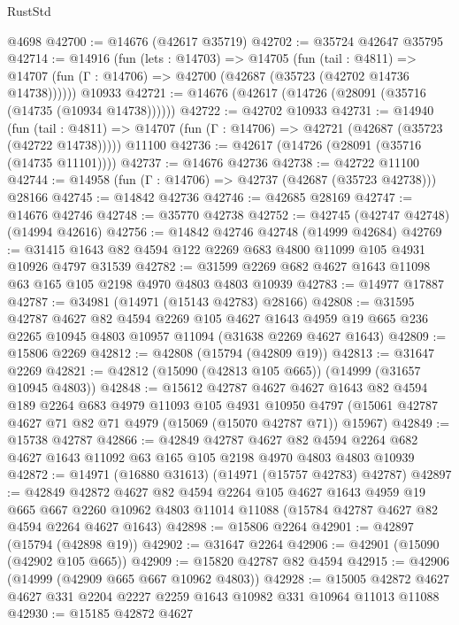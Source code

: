 \begin{lexlean}{RustStd}
\begin{coremodule}
    @4698
@42700 := @14676 (@42617 @35719)
@42702 := @35724 @42647 @35795
@42714 := @14916
    (fun (lets : @14703) =>
    @14705
      (fun (tail : @4811) =>
      @14707 (fun (Γ : @14706) => @42700 (@42687 (@35723 (@42702 @14736 @14738))))))
    @10933
@42721 := @14676 (@42617 (@14726 (@28091 (@35716 (@14735 (@10934 @14738))))))
@42722 := @42702 @10933
@42731 := @14940
    (fun (tail : @4811) => @14707 (fun (Γ : @14706) => @42721 (@42687 (@35723 (@42722 @14738)))))
    @11100
@42736 := @42617 (@14726 (@28091 (@35716 (@14735 @11101))))
@42737 := @14676 @42736
@42738 := @42722 @11100
@42744 := @14958 (fun (Γ : @14706) => @42737 (@42687 (@35723 @42738))) @28166
@42745 := @14842 @42736
@42746 := @42685 @28169
@42747 := @14676 @42746
@42748 := @35770 @42738
@42752 := @42745 (@42747 @42748) (@14994 @42616)
@42756 := @14842 @42746 @42748 (@14999 @42684)
@42769 := @31415 @1643 @82 @4594 @122 @2269 @683 @4800 @11099 @105 @4931 @10926 @4797 @31539
@42782 := @31599 @2269 @682 @4627 @1643 @11098 @63 @165 @105 @2198 @4970 @4803 @4803 @10939
@42783 := @14977 @17887
@42787 := @34981 (@14971 (@15143 @42783) @28166)
@42808 := @31595
    @42787
    @4627
    @82
    @4594
    @2269
    @105
    @4627
    @1643
    @4959
    @19
    @665
    @236
    @2265
    @10945
    @4803
    @10957
    @11094
    (@31638 @2269 @4627 @1643)
@42809 := @15806 @2269
@42812 := @42808 (@15794 (@42809 @19))
@42813 := @31647 @2269
@42821 := @42812 (@15090 (@42813 @105 @665)) (@14999 (@31657 @10945 @4803))
@42848 := @15612
    @42787
    @4627
    @4627
    @1643
    @82
    @4594
    @189
    @2264
    @683
    @4979
    @11093
    @105
    @4931
    @10950
    @4797
    (@15061 @42787 @4627 @71 @82 @71 @4979 (@15069 (@15070 @42787 @71)) @15967)
@42849 := @15738 @42787
@42866 := @42849
    @42787
    @4627
    @82
    @4594
    @2264
    @682
    @4627
    @1643
    @11092
    @63
    @165
    @105
    @2198
    @4970
    @4803
    @4803
    @10939
@42872 := @14971 (@16880 @31613) (@14971 (@15757 @42783) @42787)
@42897 := @42849
    @42872
    @4627
    @82
    @4594
    @2264
    @105
    @4627
    @1643
    @4959
    @19
    @665
    @667
    @2260
    @10962
    @4803
    @11014
    @11088
    (@15784 @42787 @4627 @82 @4594 @2264 @4627 @1643)
@42898 := @15806 @2264
@42901 := @42897 (@15794 (@42898 @19))
@42902 := @31647 @2264
@42906 := @42901 (@15090 (@42902 @105 @665))
@42909 := @15820 @42787 @82 @4594
@42915 := @42906 (@14999 (@42909 @665 @667 @10962 @4803))
@42928 := @15005 @42872 @4627 @4627 @331 @2204 @2227 @2259 @1643 @10982 @331 @10964 @11013 @11088
@42930 := @15185 @42872 @4627

\end{coremodule}
\end{lexlean}
